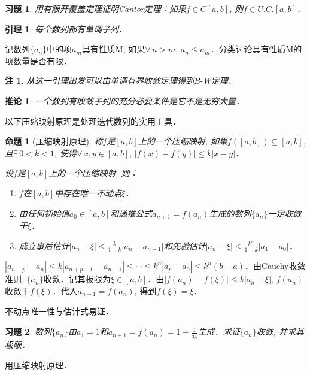 \documentclass[11pt,a4paper]{ctexart}
\makeatletter
\theoremstyle{thmseries} %
\newtheorem{cor}{推论}[section]
\newtheorem{prop}{命题}[section]
\newtheorem{lem}{引理}[section]
\theoremstyle{exerseries}
\newtheorem{exer}{习题}[section]
\newtheorem*{rem}{注}
\renewenvironment{proof}[1][\proofname]{\par
  \pushQED{\qed}%
  \normalfont \topsep6\p@\@plus6\p@\relax
  \trivlist
  \item[\hskip\labelsep
        \itshape
    #1\@addpunct{}]\ignorespaces
}{%
  \popQED\endtrivlist\@endpefalse
}
\newenvironment{pf}{\begin{proof}[\bfseries\upshape 证\quad]}{\end{proof}}
\newcommand{\bra}[1]{\mathopen{}\left(#1\right)}
\makeatother
\begin{document}
\begin{exer}
	用有限开覆盖定理证明Cantor定理：如果$f\in C[a,b]$, 则$f\in U.C.[a,b]$．
\end{exer}

\begin{lem}
	每个数列都有单调子列．
\end{lem}
\begin{pf}
	记数列$\{a_n\}$中的项$a_m$具有性质M, 如果$\forall\,n>m,\,a_n\leq a_m$．分类讨论具有性质M的项数量是否有限．
\end{pf}
\begin{rem}
	从这一引理出发可以由单调有界收敛定理得到B-W定理．
\end{rem}

\begin{cor}
	一个数列有收敛子列的充分必要条件是它不是无穷大量．
\end{cor}

以下压缩映射原理是处理迭代数列的实用工具．
\begin{prop}[压缩映射原理]
	称$f$是$[a,b]$上的一个压缩映射, 如果$f\bra{[a,b]}\subseteq[a,b]$, 且$\exists\,0<k<1$, 使得$\forall\,x,y\in[a,b],\,|f(x)-f(y)|\leq k|x-y|$．

	设$f$是$[a,b]$上的一个压缩映射, 则：
	\begin{enumerate}
		\item $f$在$[a,b]$中存在唯一不动点$\xi$．
		\item 由任何初始值$a_0\in[a,b]$和递推公式$a_{n+1}=f(a_n)$生成的数列$\{a_n\}$一定收敛于$\xi$．
		\item 成立事后估计$|a_n-\xi|\leq\frac{k}{1-k}|a_n-a_{n-1}|$和先验估计$|a_n-\xi|\leq\frac{k^n}{1-k}|a_1-a_0|$．
	\end{enumerate}
\end{prop}
\begin{pf}
	$|a_{n+p}-a_n|\leq k|a_{n+p-1}-a_{n-1}|\leq\cdots\leq k^n|a_p-a_0|\leq k^n(b-a)$．由Cauchy收敛准则, $\{a_n\}$收敛．记其极限为$\xi\in[a,b]$．由$|f(a_n)-f(\xi)|\leq k|a_n-\xi|,\,f(a_n)$收敛于$f(\xi)$．代入$a_{n+1}=f(a_n)$, 得到$f(\xi)=\xi$．

	不动点唯一性与估计式易证．
\end{pf}

\begin{exer}
	数列$\{a_n\}$由$a_1=1$和$a_{n+1}=f(a_n)=1+\frac{1}{a_n}$生成．求证$\{a_n\}$收敛, 并求其极限．
\end{exer}
\begin{pf}
	用压缩映射原理．
\end{pf}
\end{document}
